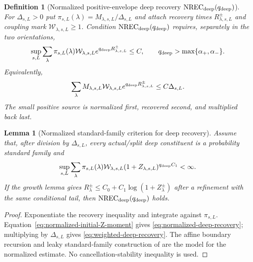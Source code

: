 \documentclass[11pt]{article}
\newtheorem{lemma}[theorem]{Lemma}
\newtheorem{definition}[theorem]{Definition}
\begin{document}
\begin{definition}[Normalized positive-envelope deep recovery
$\mathrm{NREC}_{\rm deep}(q_{\rm deep})$]
\label{def:normalized-deep-recovery}
For $\Delta_{s,L}>0$ put
$\pi_{s,L}(\lambda)=M_{\lambda,s,L}/\Delta_{s,L}$ and attach recovery
times $R^\pm_{\lambda,s,L}$ and coupling mark
$\mathcal W_{\lambda,s,L}\ge1$.  Condition
$\mathrm{NREC}_{\rm deep}(q_{\rm deep})$ requires, separately in the two
orientations,
\begin{equation}
\label{eq:normalized-deep-recovery}
 \sup_{s,L}\sum_\lambda\pi_{s,L}(\lambda)
 \mathcal W_{\lambda,s,L}e^{q_{\rm deep}R^\pm_{\lambda,s,L}}\le C,
 \qquad q_{\rm deep}>\max\{\alpha_+,\alpha_-\}.
\end{equation}
Equivalently,
\begin{equation}
\label{eq:weighted-deep-recovery}
 \sum_\lambda M_{\lambda,s,L}\mathcal W_{\lambda,s,L}
 e^{q_{\rm deep}R^\pm_{\lambda,s,L}}\le C\Delta_{s,L}.
\end{equation}
The small positive source is normalized first, recovered second, and
multiplied back last.
\end{definition}

\begin{lemma}[Normalized standard-family criterion for deep recovery]
\label{lem:normalized-deep-recovery-criterion}
Assume that, after division by $\Delta_{s,L}$, every actual/split deep
constituent is a probability standard family and
\begin{equation}
\label{eq:normalized-initial-Z-moment}
 \sup_{s,L}\sum_\lambda\pi_{s,L}(\lambda)
 \mathcal W_{\lambda,s,L}
 (1+Z_{\lambda,s,L})^{q_{\rm deep}C_1}<\infty .
\end{equation}
If the growth lemma gives
$R^\pm_\lambda\le C_0+C_1\log(1+Z^\pm_\lambda)$ after a refinement with
the same conditional tail, then
$\mathrm{NREC}_{\rm deep}(q_{\rm deep})$ holds.
\end{lemma}

\begin{proof}
Exponentiate the recovery inequality and integrate against $\pi_{s,L}$.
Equation~\eqref{eq:normalized-initial-Z-moment} gives
\eqref{eq:normalized-deep-recovery}; multiplying by $\Delta_{s,L}$ gives
\eqref{eq:weighted-deep-recovery}.  The affine boundary recursion and leaky
standard-family construction of \cite{CanestrariHoles} are the model for
the normalized estimate.  No cancellation-stability inequality is used.
\end{proof}
\end{document}
